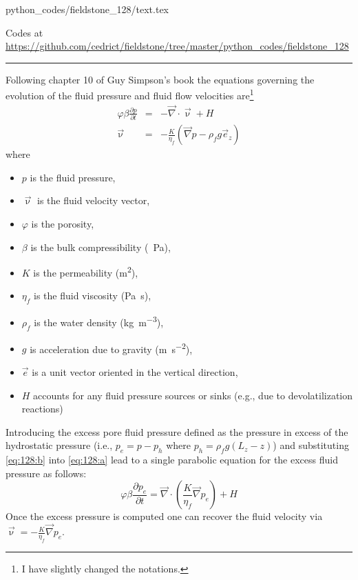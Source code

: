 \begin{flushright} {\tiny {\color{gray} python\_codes/fieldstone\_128/text.tex}} \end{flushright}



\begin{center}
Codes at \url{https://github.com/cedrict/fieldstone/tree/master/python_codes/fieldstone_128}
\end{center}

\par\noindent\rule{\textwidth}{0.4pt}


Following chapter 10 of Guy Simpson's book \cite{simp17} the equations
governing the evolution of the fluid pressure and fluid flow velocities are\footnote{I have slightly changed the notations.}
\begin{eqnarray}
\varphi \beta \frac{\partial p}{\partial t} &=& -\vec\nabla \cdot \vec \upnu + H \label{eq:128:a}\\
\vec\upnu &=& -\frac{K}{\eta_f} (\vec\nabla p - \rho_f g \vec{e}_z) \label{eq:128:b}
\end{eqnarray}
where
\begin{itemize}
\item $p$ is the fluid pressure, 
\item $\vec\upnu$ is the fluid velocity vector, 
\item $\varphi$ is the porosity, 
\item $\beta$ is the bulk compressibility (\si{\per\pascal}), 
\item $K$ is the permeability (\si{\square\meter}), 
\item $\eta_f$ is the fluid viscosity (\si{\pascal\second}), 
\item $\rho_f$ is the water density (\si{\kg\per\cubic\meter}), 
\item $g$ is acceleration due to gravity (\si{\meter\per\square\second}), 
\item $\vec{e}$ is a unit vector oriented in the vertical direction, 
\item $H$ accounts for any fluid pressure sources or sinks (e.g., due to devolatilization reactions)
\end{itemize}
Introducing the excess pore fluid pressure defined as the pressure in excess of the hydrostatic pressure 
(i.e., $p_e = p-p_h$ where $p_h = \rho_f g (L_z-z)$) and 
substituting \eqref{eq:128:b} into \eqref{eq:128:a} lead to a single parabolic equation for
the excess fluid pressure as follows:
\begin{equation}
\varphi \beta  \frac{\partial p_e}{\partial t}
=
\vec\nabla \cdot \left( \frac{K}{\eta_f} \vec\nabla p_e  \right) + H
\end{equation}
Once the excess pressure is computed one can recover the fluid velocity via $\vec\upnu=-\frac{K}{\eta_f} \vec\nabla p_e$.

